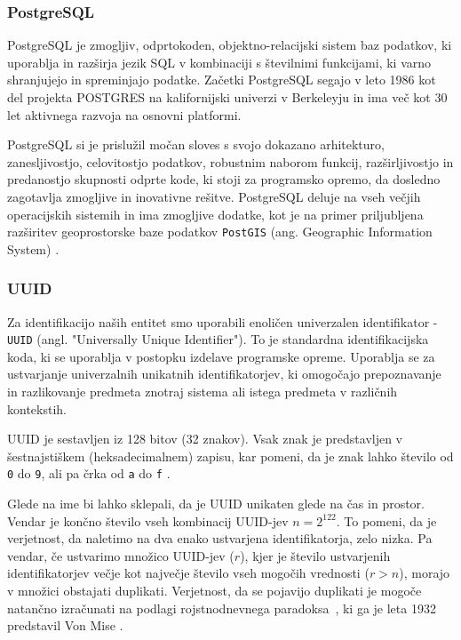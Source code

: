\documentclass[a4paper, 12pt]{book}
\begin{document}
\subsubsection{PostgreSQL}
PostgreSQL je zmogljiv, odprtokoden, objektno-relacijski sistem baz podatkov, ki uporablja in razširja jezik SQL v kombinaciji s številnimi funkcijami, ki varno shranjujejo in spreminjajo podatke. Začetki PostgreSQL segajo v leto 1986 kot del projekta POSTGRES na kalifornijski univerzi v Berkeleyju in ima več kot 30 let aktivnega razvoja na osnovni platformi.

PostgreSQL si je prislužil močan sloves s svojo dokazano arhitekturo, zanesljivostjo, celovitostjo podatkov, robustnim naborom funkcij, razširljivostjo in predanostjo skupnosti odprte kode, ki stoji za programsko opremo, da dosledno zagotavlja zmogljive in inovativne rešitve. 
PostgreSQL deluje na vseh večjih operacijskih sistemih in ima zmogljive dodatke, kot je na primer priljubljena razširitev geoprostorske baze podatkov \verb=PostGIS= (ang. Geographic Information System) \cite{pg-database-postgis}.


\subsubsection{UUID}
Za identifikacijo naših entitet smo uporabili enoličen univerzalen identifikator - \verb=UUID= (angl. "Universally Unique Identifier"). To je standardna identifikacijska koda, ki se uporablja v postopku izdelave programske opreme. Uporablja se za ustvarjanje univerzalnih unikatnih identifikatorjev, ki omogočajo prepoznavanje in razlikovanje predmeta znotraj sistema ali istega predmeta v različnih kontekstih.

UUID je sestavljen iz 128 bitov (32 znakov). Vsak znak je predstavljen v šestnajstiškem (heksadecimalnem) zapisu, kar pomeni, da je znak lahko število od \verb=0= do \verb=9=, ali pa črka od \verb=a= do \verb=f= \cite{uuid-rfc}.

Glede na ime bi lahko sklepali, da je UUID unikaten glede na čas in prostor. Vendar je končno število vseh kombinacij UUID-jev $n=2^{122}$. To pomeni, da je verjetnost, da naletimo na dva enako ustvarjena identifikatorja, zelo nizka.
Pa vendar, če ustvarimo množico UUID-jev ($r$), kjer je število ustvarjenih identifikatorjev večje kot največje število vseh mogočih vrednosti ($r > n$), morajo v množici obstajati duplikati. Verjetnost, da se pojavijo duplikati je mogoče natančno izračunati na podlagi rojstnodnevnega paradoksa~\cite{birthday-problem-what-is}, ki ga je leta 1932 predstavil Von Mise \cite{birthday-problem-inventor}.
\end{document}
